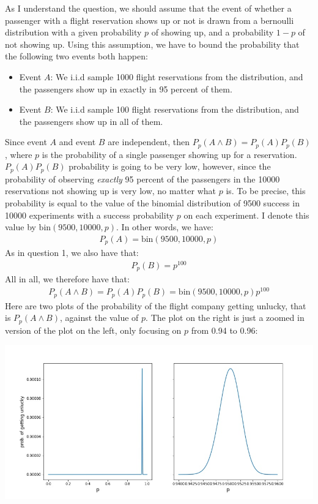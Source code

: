 As I understand the question, we should assume that the event of whether a passenger with a flight reservation shows up or not is drawn from a bernoulli distribution with a given probability $p$ of showing up, and a probability $1-p$ of not showing up. Using this assumption, we have to bound the probability that the following two events both happen: 
\begin{itemize}
\item Event $A$: We i.i.d sample 1000 flight reservations from the distribution, and the passengers show up in exactly in 95 percent of them.
\item Event $B$: We i.i.d sample 100 flight reservations from the distribution, and the passengers show up in all of them.
\end{itemize}
Since event $A$ and event $B$ are independent, then $P_p(A \land B) = P_p(A)P_p(B)$, where $p$ is the probability of a single passenger showing up for a reservation. $P_p(A)P_p(B)$ probability is going to be very low, however, since the probability of observing \textit{exactly} 95 percent of the passengers in the 10000 reservations not showing up is very low, no matter what $p$ is. To be precise, this probability is equal to the value of the binomial distribution of 9500 success in 10000 experiments with a success probability $p$ on each experiment. I denote this value by $\text{bin}(9500, 10000,p)$. In other words, we have:
\begin{align}
P_p(A) = \text{bin}(9500, 10000,p)
\end{align}
As in question 1, we also have that:
\begin{align}
P_p(B) = p^{100}
\end{align}
All in all, we therefore have that:
\begin{align}
P_p(A \land B) = P_p(A)P_p(B) = \text{bin}(9500, 10000,p) p^{100}
\end{align}
Here are two plots of the probability of the flight company getting unlucky, that is $P_p(A \land B)$, against the value of $p$. The plot on the right is just a zoomed in version of the plot on the left, only focusing on $p$ from 0.94 to 0.96:
\begin{center}
\includegraphics[scale=0.5]{airline_revisited/fig1.jpg}
\end{center}
